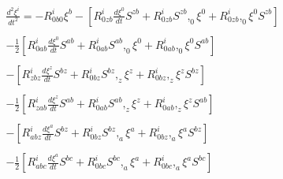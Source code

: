 \begin{equation}
\begin{array}{c}
\frac{d^{2}\xi ^{i}}{dt^{2}}=-R_{0b0}^{i}\xi ^{b}-[R_{0zb}^{i}\frac{d\xi ^{0}%
}{dt}S^{zb}+R_{0zb}^{i}S^{zb},_{0}\xi ^{0}+R_{0zb}^{i},_{0}\xi ^{0}S^{zb}]
\\ 
\\ 
-\frac{1}{2}[R_{0ab}^{i}\frac{d\xi ^{0}}{dt}S^{ab}+R_{0ab}^{i}S^{ab},_{0}\xi
^{0}+R_{0ab}^{i},_{0}\xi ^{0}S^{ab}] \\ 
\\ 
-[R_{zbz}^{i}\frac{d\xi ^{z}}{dt}S^{bz}+R_{0bz}^{i}S^{bz},_{z}\xi
^{z}+R_{0bz}^{i},_{z}\xi ^{z}S^{bz}] \\ 
\\ 
-\frac{1}{2}[R_{zab}^{i}\frac{d\xi ^{z}}{dt}S^{ab}+R_{0ab}^{i}S^{ab},_{z}\xi
^{z}+R_{0ab}^{i},_{z}\xi ^{z}S^{ab}] \\ 
\\ 
-[R_{abz}^{i}\frac{d\xi ^{a}}{dt}S^{bz}+R_{0bz}^{i}S^{bz},_{a}\xi
^{a}+R_{0bz}^{i},_{a}\xi ^{a}S^{bz}] \\ 
\\ 
-\frac{1}{2}[R_{abc}^{i}\frac{d\xi ^{a}}{dt}S^{bc}+R_{0bc}^{i}S^{bc},_{a}\xi
^{a}+R_{0bc}^{i},_{a}\xi ^{a}S^{bc}]
\end{array}
\label{44}
\end{equation}

